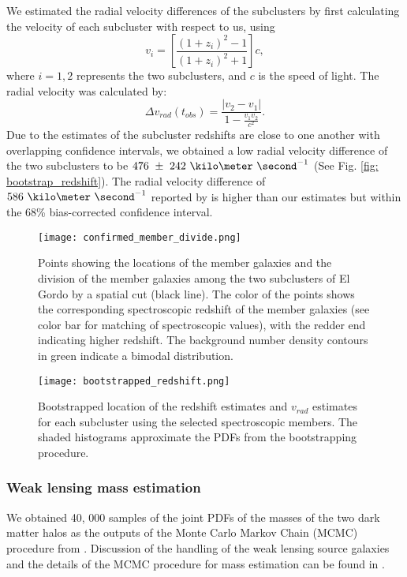 We estimated the radial velocity differences of the
subclusters by first calculating the velocity of each subcluster with
respect to us, using  
\begin{equation}
	v_i = \left[ \frac{(1+z_i)^2 - 1 }{(1+z_i)^2 + 1 }\right]c,
\end{equation}
where $i=1, 2$ represents the two subclusters, and $c$ is the speed of
light. The radial velocity was calculated by: 
\begin{equation}
	\Delta v_{rad}(t_{obs}) = \frac{|v_2 - v_1|}{1-\frac{v_1 v_2}{c^2}}.
\end{equation}
Due to the estimates of the subcluster redshifts are close to
one another with overlapping confidence intervals, we obtained a low 
radial velocity difference of the two subclusters to be
$476~\pm~242~\kilo\meter~\second^{-1}$ (See Fig. \ref{fig:
bootstrap_redshift}). 
The radial velocity difference of $586~\kilo \meter~\second^{-1}$ reported by  
is higher than our estimates but within the 68\% bias-corrected
confidence interval. 
\begin{figure}
	\texttt{[image: confirmed\_member\_divide.png]}
	\caption{\label{fig:membership} Points showing the locations of the
	member galaxies and the division of the member galaxies among the two subclusters of El Gordo by a spatial cut
(black line). The color of the points shows the corresponding spectroscopic
redshift of the member galaxies (see color bar for matching of
spectroscopic values), with the redder end indicating higher
redshift. The background number density contours in green indicate a bimodal
distribution.} 
\end{figure}
\begin{figure}
	\texttt{[image: bootstrapped\_redshift.png]}
	\caption{\label{fig: bootstrap_redshift} Bootstrapped location of the
	redshift estimates and $v_{rad}$ estimates for each subcluster using the
	selected spectroscopic members. The shaded histograms approximate the
	PDFs from the bootstrapping procedure.
} 
\end{figure}
\subsubsection{Weak lensing mass estimation} 
We obtained 40, 000 samples of the joint PDFs of the masses of the two dark
matter halos as the outputs of the Monte Carlo Markov Chain (MCMC)
procedure from \citealt{Jee13}. Discussion of the handling of the weak
lensing source galaxies and the details of the MCMC procedure for mass
estimation can be found in \citealt{Jee13}. 
